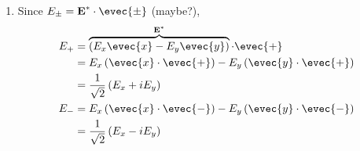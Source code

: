 \documentclass{homework}
\newtheorem*{ident}{Identity}
\begin{document}
\begin{enumerate}
\begin{enumerate}
			\vspace{1em}
			\begin{ident}
				$\evec{\pm}^* \cross \evec{\pm} = \pm i \uvec{z}$
			\end{ident}
			\begin{proof}
				For $\evec{+}$ and ignoring the normalization constant again, \begin{align*}
					\left(\evec{x} - i\evec{y}\right) \cross \left(\evec{x} + i \evec{y}\right) & = \left(\evec{x} \cross i\evec{y}\right) + \left(-\evec{y} \cross \evec{x}\right) \\
						& = 2 \left(\evec{x} \cross i \evec{y}\right) \\
						& = i \uvec{z} && \text{Renormalizing}
				\end{align*}
			\end{proof}
			\vspace{1em}
			\begin{ident}
				$i \uvec{z} \cross \evec{\pm} = \pm \evec{\pm}$
			\end{ident}
			\begin{proof}
				For either $\evec{\pm}$ vector, \begin{align*}
					i \uvec{z} \cross \left(\evec{x} \pm i \evec{y}\right) & = \left(i \uvec{z} \cross \evec{x}\right) \pm \left(i \uvec{z} \cross i \evec{y}\right) \\
						& = \left(i \evec{y}\right) \mp \left(-\evec{x}\right) \\
						& = \pm \left( \evec{x} \pm  i \evec{y}\right) = \pm \evec{\pm}
				\end{align*}
			\end{proof}
		
			\item Since $E_\pm = \bvec{E}^* \cdot \evec{\pm}$ (maybe?), \begin{align*}
				E_+ & = \overbrace{ \left(E_x \evec{x} - E_y \evec{y}\right) }^{\bvec{E}^*} \cdot \evec{+} \\
					& = E_x \left(\evec{x} \cdot \evec{+}\right) - E_y \left(\evec{y} \cdot \evec{+}\right) \\
					& = \frac{1}{\sqrt{2}} \left( E_x + i E_y \right)\\
				E_- & = E_x \left(\evec{x} \cdot \evec{-}\right) - E_y \left(\evec{y} \cdot \evec{-}\right) \\
					& = \frac{1}{\sqrt{2}} \left( E_x - i E_y\right)
			\end{align*}
		\end{enumerate}
	

\end{enumerate}
\end{document}
